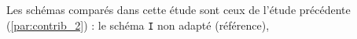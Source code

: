 Les schémas comparés dans cette étude sont ceux de l'étude précédente (\ref{par:contrib_2}) : 
le schéma \texttt{I} non adapté (référence),

